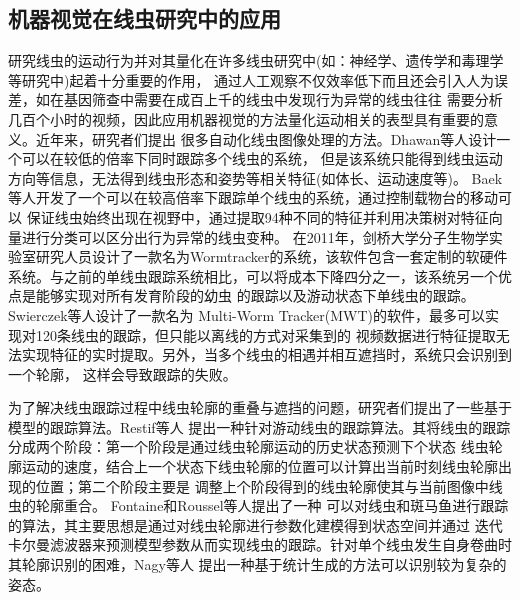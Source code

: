 	
\subsection{机器视觉在线虫研究中的应用}
\label{sec:intro:analog}
	研究线虫的运动行为并对其量化在许多线虫研究中(如：神经学、遗传学和毒理学等研究中)起着十分重要的作用，
	通过人工观察不仅效率低下而且还会引入人为误差，如在基因筛查中需要在成百上千的线虫中发现行为异常的线虫往往
	需要分析几百个小时的视频，因此应用机器视觉的方法量化运动相关的表型具有重要的意义。近年来，研究者们提出
	很多自动化线虫图像处理的方法。Dhawan等人\cite{De1998Natural}设计一个可以在较低的倍率下同时跟踪多个线虫的系统，
	但是该系统只能得到线虫运动方向等信息，无法得到线虫形态和姿势等相关特征(如体长、运动速度等)。
	Baek等人\cite{Baek2002Using}开发了一个可以在较高倍率下跟踪单个线虫的系统，通过控制载物台的移动可以
	保证线虫始终出现在视野中，通过提取94种不同的特征并利用决策树对特征向量进行分类可以区分出行为异常的线虫变种。
	在2011年，剑桥大学分子生物学实验室研究人员设计了一款名为Wormtracker的系统，该软件包含一套定制的软硬件
	系统\cite{yemini2013high}。与之前的单线虫跟踪系统相比，可以将成本下降四分之一，该系统另一个优点是能够实现对所有发育阶段的幼虫
	的跟踪以及游动状态下单线虫的跟踪。Swierczek等人\cite{swierczek2011high}设计了一款名为
	Multi-Worm Tracker(MWT)的软件，最多可以实现对120条线虫的跟踪，但只能以离线的方式对采集到的
	视频数据进行特征提取无法实现特征的实时提取。另外，当多个线虫的相遇并相互遮挡时，系统只会识别到一个轮廓，
	这样会导致跟踪的失败。
	
	为了解决线虫跟踪过程中线虫轮廓的重叠与遮挡的问题，研究者们提出了一些基于模型的跟踪算法。Restif等人\cite{restif2008tracking}
	提出一种针对游动线虫的跟踪算法。其将线虫的跟踪分成两个阶段：第一个阶段是通过线虫轮廓运动的历史状态预测下个状态
	线虫轮廓运动的速度，结合上一个状态下线虫轮廓的位置可以计算出当前时刻线虫轮廓出现的位置；第二个阶段主要是
	调整上个阶段得到的线虫轮廓使其与当前图像中线虫的轮廓重合。 Fontaine和Roussel等人\cite{fontaine2007model,roussel2014robust}提出了一种
	可以对线虫和斑马鱼进行跟踪的算法，其主要思想是通过对线虫轮廓进行参数化建模得到状态空间并通过
	迭代卡尔曼滤波器来预测模型参数从而实现线虫的跟踪。针对单个线虫发生自身卷曲时其轮廓识别的困难，Nagy等人
	\cite{nagy2015generative}提出一种基于统计生成的方法可以识别较为复杂的姿态。
	
